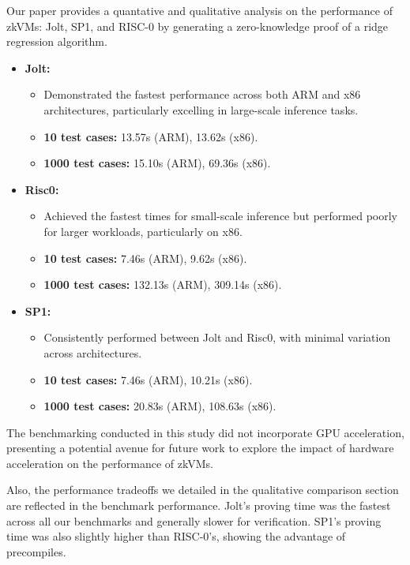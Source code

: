 \documentclass{scrartcl}
\begin{document}
Our paper\cite{zkbenchmark} provides a quantative and qualitative analysis on the performance of zkVMs: Jolt, SP1, and RISC-0 by generating a zero-knowledge proof of a ridge regression algorithm.

\begin{itemize}
	\item \textbf{Jolt:}
	      \begin{itemize}
		      \item Demonstrated the fastest performance across both ARM and x86 architectures, particularly excelling in large-scale inference tasks.
		      \item \textbf{10 test cases:} 13.57s (ARM), 13.62s (x86).
		      \item \textbf{1000 test cases:} 15.10s (ARM), 69.36s (x86).
	      \end{itemize}
	\item \textbf{Risc0:}
	      \begin{itemize}
		      \item Achieved the fastest times for small-scale inference but performed poorly for larger workloads, particularly on x86.
		      \item \textbf{10 test cases:} 7.46s (ARM), 9.62s (x86).
		      \item \textbf{1000 test cases:} 132.13s (ARM), 309.14s (x86).
	      \end{itemize}
	\item \textbf{SP1:}
	      \begin{itemize}
		      \item Consistently performed between Jolt and Risc0, with minimal variation across architectures.
		      \item \textbf{10 test cases:} 7.46s (ARM), 10.21s (x86).
		      \item \textbf{1000 test cases:} 20.83s (ARM), 108.63s (x86).
	      \end{itemize}
\end{itemize}

The benchmarking conducted in this study did not incorporate GPU acceleration, presenting a potential avenue for future work to explore the impact of hardware acceleration on the performance of zkVMs.

Also, the performance tradeoffs we detailed in the qualitative comparison section are reflected in the benchmark performance. Jolt's proving time was the fastest across all our benchmarks and generally slower for verification. SP1's proving time was also slightly higher than RISC-0's, showing the advantage of precompiles.

\newpage
\singlespacing




\end{document}
